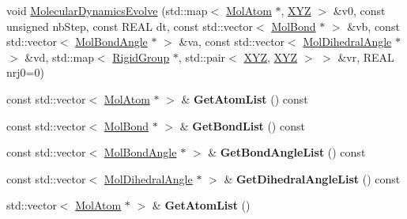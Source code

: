 \begin{DoxyCompactItemize}
void \mbox{\hyperlink{class_obj_cryst_1_1_molecule_a9a43c803d62dc4f5f3b7852bbd75c939}{Molecular\+Dynamics\+Evolve}} (std\+::map$<$ \mbox{\hyperlink{class_obj_cryst_1_1_mol_atom}{Mol\+Atom}} $\ast$, \mbox{\hyperlink{struct_obj_cryst_1_1_x_y_z}{X\+YZ}} $>$ \&v0, const unsigned nb\+Step, const R\+E\+AL dt, const std\+::vector$<$ \mbox{\hyperlink{class_obj_cryst_1_1_mol_bond}{Mol\+Bond}} $\ast$ $>$ \&vb, const std\+::vector$<$ \mbox{\hyperlink{class_obj_cryst_1_1_mol_bond_angle}{Mol\+Bond\+Angle}} $\ast$ $>$ \&va, const std\+::vector$<$ \mbox{\hyperlink{class_obj_cryst_1_1_mol_dihedral_angle}{Mol\+Dihedral\+Angle}} $\ast$ $>$ \&vd, std\+::map$<$ \mbox{\hyperlink{class_obj_cryst_1_1_rigid_group}{Rigid\+Group}} $\ast$, std\+::pair$<$ \mbox{\hyperlink{struct_obj_cryst_1_1_x_y_z}{X\+YZ}}, \mbox{\hyperlink{struct_obj_cryst_1_1_x_y_z}{X\+YZ}} $>$ $>$ \&vr, R\+E\+AL nrj0=0)
\item 
\mbox{\label{class_obj_cryst_1_1_molecule_a5ba1b2f897c4b13e5b555b61dd2daa59}} 
const std\+::vector$<$ \mbox{\hyperlink{class_obj_cryst_1_1_mol_atom}{Mol\+Atom}} $\ast$ $>$ \& {\bfseries Get\+Atom\+List} () const
\item 
\mbox{\label{class_obj_cryst_1_1_molecule_a7d429b461bc0b82705486cbbe7fa79dd}} 
const std\+::vector$<$ \mbox{\hyperlink{class_obj_cryst_1_1_mol_bond}{Mol\+Bond}} $\ast$ $>$ \& {\bfseries Get\+Bond\+List} () const
\item 
\mbox{\label{class_obj_cryst_1_1_molecule_a3e650647dad75c14d635c9ac42e61142}} 
const std\+::vector$<$ \mbox{\hyperlink{class_obj_cryst_1_1_mol_bond_angle}{Mol\+Bond\+Angle}} $\ast$ $>$ \& {\bfseries Get\+Bond\+Angle\+List} () const
\item 
\mbox{\label{class_obj_cryst_1_1_molecule_ad4f1aa9f4ac2155e42ed912588022c14}} 
const std\+::vector$<$ \mbox{\hyperlink{class_obj_cryst_1_1_mol_dihedral_angle}{Mol\+Dihedral\+Angle}} $\ast$ $>$ \& {\bfseries Get\+Dihedral\+Angle\+List} () const
\item 
\mbox{\label{class_obj_cryst_1_1_molecule_ab7984ff2a241a0631e7377a869379051}} 
std\+::vector$<$ \mbox{\hyperlink{class_obj_cryst_1_1_mol_atom}{Mol\+Atom}} $\ast$ $>$ \& {\bfseries Get\+Atom\+List} ()
\item 

\end{DoxyCompactItemize}
